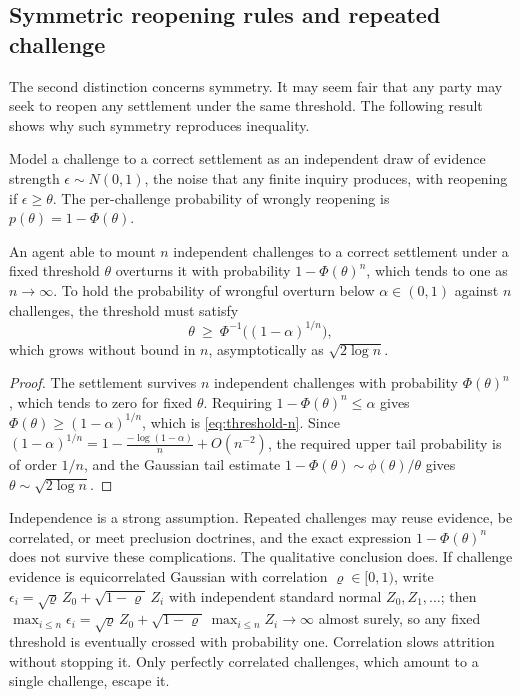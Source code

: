 \subsection{Symmetric reopening rules and repeated challenge}

The second distinction concerns symmetry. It may seem fair that any party may seek to reopen any settlement under the same threshold. The following result shows why such symmetry reproduces inequality.

Model a challenge to a correct settlement as an independent draw of evidence strength $\epsilon\sim N(0,1)$, the noise that any finite inquiry produces, with reopening if $\epsilon\geq\theta$. The per-challenge probability of wrongly reopening is $p(\theta)=1-\Phi(\theta)$.

\begin{proposition}\label{prop:attrition}
An agent able to mount $n$ independent challenges to a correct settlement under a fixed threshold $\theta$ overturns it with probability $1-\Phi(\theta)^n$, which tends to one as $n\to\infty$. To hold the probability of wrongful overturn below $\alpha\in(0,1)$ against $n$ challenges, the threshold must satisfy
\begin{equation}\label{eq:threshold-n}
\theta\ \geq\ \Phi^{-1}\!\big((1-\alpha)^{1/n}\big),
\end{equation}
which grows without bound in $n$, asymptotically as $\sqrt{2\log n}$.
\end{proposition}

\begin{proof}
The settlement survives $n$ independent challenges with probability $\Phi(\theta)^n$, which tends to zero for fixed $\theta$. Requiring $1-\Phi(\theta)^n\leq\alpha$ gives $\Phi(\theta)\geq(1-\alpha)^{1/n}$, which is \eqref{eq:threshold-n}. Since $(1-\alpha)^{1/n}=1-\frac{-\log(1-\alpha)}{n}+O(n^{-2})$, the required upper tail probability is of order $1/n$, and the Gaussian tail estimate $1-\Phi(\theta)\sim\phi(\theta)/\theta$ gives $\theta\sim\sqrt{2\log n}$.
\end{proof}

\begin{remark}
Independence is a strong assumption. Repeated challenges may reuse evidence, be correlated, or meet preclusion doctrines, and the exact expression $1-\Phi(\theta)^n$ does not survive these complications. The qualitative conclusion does. If challenge evidence is equicorrelated Gaussian with correlation $\varrho\in[0,1)$, write $\epsilon_i=\sqrt{\varrho}\,Z_0+\sqrt{1-\varrho}\,Z_i$ with independent standard normal $Z_0,Z_1,\dots$; then $\max_{i\leq n}\epsilon_i=\sqrt{\varrho}\,Z_0+\sqrt{1-\varrho}\,\max_{i\leq n}Z_i\to\infty$ almost surely, so any fixed threshold is eventually crossed with probability one. Correlation slows attrition without stopping it. Only perfectly correlated challenges, which amount to a single challenge, escape it.
\end{remark}


